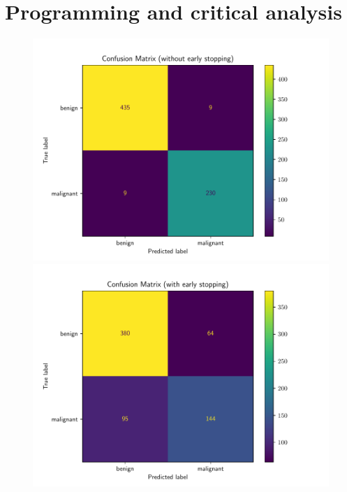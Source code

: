 \documentclass{exam}
\begin{document}
    \section{Programming and critical analysis}
    \begin{questions}
        \setcounter{question}{1}
        \item \quad
        \vspace{-1.3em}
        \begin{figure}[H]
            \centering
            \begin{minipage}[b]{0.49\textwidth}
              \includegraphics[width=\textwidth]{mlp_conf_matrix_False.pdf}
            \end{minipage}
            \begin{minipage}[b]{0.49\textwidth}
              \includegraphics[width=\textwidth]{mlp_conf_matrix_True.pdf}

\end{minipage}
\end{figure}
\end{questions}
\end{document}
